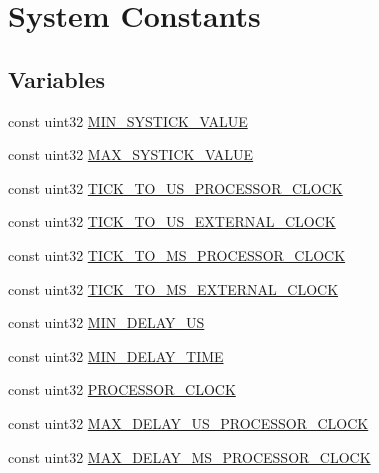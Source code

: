 \hypertarget{group___sys_const}{\section{System Constants}
\label{group___sys_const}
}
\subsection*{Variables}
\begin{DoxyCompactItemize}
\item 
const uint32 \hyperlink{group___sys_const_ga4d598af764d8057c858a7ee7f78d5a95}{M\-I\-N\-\_\-\-S\-Y\-S\-T\-I\-C\-K\-\_\-\-V\-A\-L\-U\-E}
\item 
const uint32 \hyperlink{group___sys_const_gacd38f813abc040ef4a3b780d73b162f0}{M\-A\-X\-\_\-\-S\-Y\-S\-T\-I\-C\-K\-\_\-\-V\-A\-L\-U\-E}
\item 
const uint32 \hyperlink{group___sys_const_ga26a0c5ce31bc1d7768ab8767c5d9d2bb}{T\-I\-C\-K\-\_\-\-T\-O\-\_\-\-U\-S\-\_\-\-P\-R\-O\-C\-E\-S\-S\-O\-R\-\_\-\-C\-L\-O\-C\-K}
\item 
const uint32 \hyperlink{group___sys_const_gae5869096154b709df4ad3c72af623a93}{T\-I\-C\-K\-\_\-\-T\-O\-\_\-\-U\-S\-\_\-\-E\-X\-T\-E\-R\-N\-A\-L\-\_\-\-C\-L\-O\-C\-K}
\item 
const uint32 \hyperlink{group___sys_const_gaa9c7cc7237b226f01bca73b6582076c1}{T\-I\-C\-K\-\_\-\-T\-O\-\_\-\-M\-S\-\_\-\-P\-R\-O\-C\-E\-S\-S\-O\-R\-\_\-\-C\-L\-O\-C\-K}
\item 
const uint32 \hyperlink{group___sys_const_ga6935f45c869a6c6ddd59428545647f73}{T\-I\-C\-K\-\_\-\-T\-O\-\_\-\-M\-S\-\_\-\-E\-X\-T\-E\-R\-N\-A\-L\-\_\-\-C\-L\-O\-C\-K}
\item 
const uint32 \hyperlink{group___sys_const_gaafad24a0101f661e5847ce34da683862}{M\-I\-N\-\_\-\-D\-E\-L\-A\-Y\-\_\-\-U\-S}
\item 
const uint32 \hyperlink{group___sys_const_ga660e78c2af5fee2218d85a4f0a896c3c}{M\-I\-N\-\_\-\-D\-E\-L\-A\-Y\-\_\-\-T\-I\-M\-E}
\item 
const uint32 \hyperlink{group___sys_const_ga046cca7fadaed4257277a0abacbe07f6}{P\-R\-O\-C\-E\-S\-S\-O\-R\-\_\-\-C\-L\-O\-C\-K}
\item 
const uint32 \hyperlink{group___sys_const_gaf24811b75380592944ac2d829205f2b6}{M\-A\-X\-\_\-\-D\-E\-L\-A\-Y\-\_\-\-U\-S\-\_\-\-P\-R\-O\-C\-E\-S\-S\-O\-R\-\_\-\-C\-L\-O\-C\-K}
\item 
const uint32 \hyperlink{group___sys_const_ga7e7b8c77154ccab96cdb8a892a089f22}{M\-A\-X\-\_\-\-D\-E\-L\-A\-Y\-\_\-\-M\-S\-\_\-\-P\-R\-O\-C\-E\-S\-S\-O\-R\-\_\-\-C\-L\-O\-C\-K}

\end{DoxyCompactItemize}
